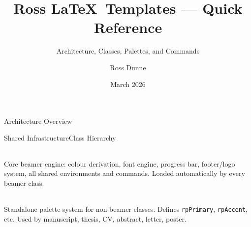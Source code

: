 \documentclass[palette=lancet]{rossbeamerscientific}
\title{Ross \LaTeX\ Templates --- Quick Reference}
\subtitle{Architecture, Classes, Palettes, and Commands}
\author{Ross Dunne}
\date{March 2026}
\newcommand{\pkg}[1]{\texttt{\color{rbSecondary}\bfseries #1}}
\begin{document}
\begin{frame}[plain]
  \titlepage
\end{frame}

\begin{frame}{Architecture Overview}
\footnotesize
\begin{comparison}{Shared Infrastructure}{Class Hierarchy}
  \begin{description}[leftmargin=0pt]
    \item[\pkg{rossbeamerbase.sty}] ~\\
      Core beamer engine: colour derivation, font engine,
      progress bar, footer/logo system, all shared environments
      and commands. Loaded automatically by every beamer class.

    \item[\pkg{rosspalettes.sty}] ~\\
      Standalone palette system for non-beamer classes.
      Defines \texttt{rpPrimary}, \texttt{rpAccent}, etc.
      Used by manuscript, thesis, CV, abstract, letter, poster.


\end{description}
\end{comparison}
\end{frame}
\end{document}
